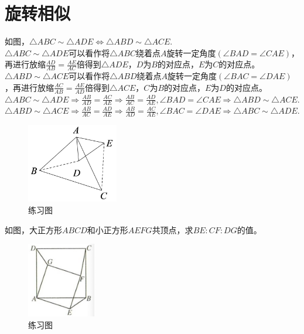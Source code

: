 \documentclass{ecnuthesis}
\begin{document}
\section{旋转相似}
\begin{model}
    如图，$\triangle ABC\sim \triangle ADE \Leftrightarrow \triangle ABD \sim \triangle ACE$. \\
    $\triangle ABC\sim \triangle ADE$可以看作将$\triangle ABC$绕着点$A$旋转一定角度$(\angle BAD=\angle CAE)$，再进行放缩$\frac{AD}{AB}=\frac{AE}{AC}$倍得到$\triangle ADE$，$D$为$B$的对应点，$E$为$C$的对应点。\\
    $\triangle ABD\sim \triangle ACE$可以看作将$\triangle ABD$绕着点$A$旋转一定角度$(\angle BAC=\angle DAE)$，再进行放缩$\frac{AC}{AB}=\frac{AE}{AD}$倍得到$\triangle ACE$，$C$为$B$的对应点，$E$为$D$的对应点。\\
    $\triangle ABC\sim \triangle ADE \Rightarrow \frac{AB}{AD}=\frac{AC}{AE} \Rightarrow \frac{AB}{AC}=\frac{AD}{AE},\angle BAD=\angle CAE \Rightarrow \triangle ABD \sim \triangle ACE.$ \\
    $\triangle ABD\sim \triangle ACE \Rightarrow \frac{AB}{AC}=\frac{AD}{AE} \Rightarrow \frac{AB}{AD}=\frac{AC}{AE},\angle BAC=\angle DAE \Rightarrow \triangle ABC \sim \triangle ADE.$
\end{model}
\begin{figure}[H]
\centering
\includegraphics[width=4cm]{picture/855.png}
\caption{练习图}
\end{figure}
\begin{problem}
    如图，大正方形$ABCD$和小正方形$AEFG$共顶点，求$BE:CF:DG$的值。
\end{problem}
\begin{figure}[H]
\centering
\includegraphics[width=3cm]{picture/856.png}
\caption{练习图}
\end{figure}
\end{document}
